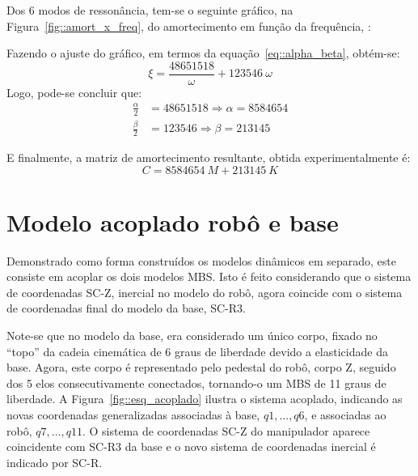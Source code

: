 Dos 6 modos de ressonância, tem-se o seguinte gráfico, na
Figura~\ref{fig::amort_x_freq}, do amortecimento em função da frequência, :


Fazendo o ajuste do gráfico, em termos da equação~\ref{eq::alpha_beta},
obtém-se:
%
\begin{equation}
	\xi = \frac{48651518}{\omega} + 123546 ~\omega
\end{equation}
%
Logo, pode-se concluir que:
%
\begin{align}
	\frac{\alpha}{2} &= 48651518 \Rightarrow  \alpha = 8584654 \\
	\frac{\beta}{2} &= 123546 \Rightarrow  \beta = 213145
\end{align} 
%

E finalmente, a matriz de amortecimento resultante, obtida experimentalmente é:
%
\begin{equation}
	C = 8584654~M + 213145~K
\end{equation}
%



\section{Modelo acoplado robô e base} \label{sec::acoplado}

Demonstrado como forma construídos os modelos dinâmicos em separado, este
consiste em acoplar os dois modelos MBS. Isto é feito considerando que o sistema
de coordenadas SC-Z, inercial no modelo do robô, agora coincide com o sistema de
coordenadas final do modelo da base, SC-R3.

Note-se que no modelo da base, era considerado um único corpo, fixado no
``topo'' da cadeia cinemática de 6 graus de liberdade devido a elasticidade da
base.
Agora, este corpo é representado pelo pedestal do robô, corpo Z, seguido dos 5
elos consecutivamente conectados, tornando-o um MBS de 11 graus de liberdade. A
Figura~\ref{fig::esq_acoplado} ilustra o sistema acoplado, indicando as novas
coordenadas generalizadas associadas à base, $q1,\ldots,q6$, e associadas ao
robô, $q7,\ldots,q11$. O sistema de coordenadas SC-Z do manipulador aparece
coincidente com SC-R3 da base e o novo sistema de coordenadas inercial é
indicado por SC-R.


